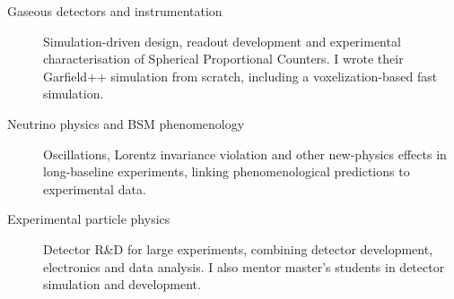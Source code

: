 \begin{description}
\item[Gaseous detectors and instrumentation] Simulation-driven design, readout
development and experimental characterisation of Spherical Proportional
Counters. I wrote their Garfield++ simulation from scratch, including a
voxelization-based fast simulation.

\item[Neutrino physics and BSM phenomenology] Oscillations, Lorentz invariance
violation and other new-physics effects in long-baseline experiments, linking
phenomenological predictions to experimental data.

\item[Experimental particle physics] Detector R\&D for large experiments,
combining detector development, electronics and data analysis. I also mentor
master's students in detector simulation and development.
\end{description}
